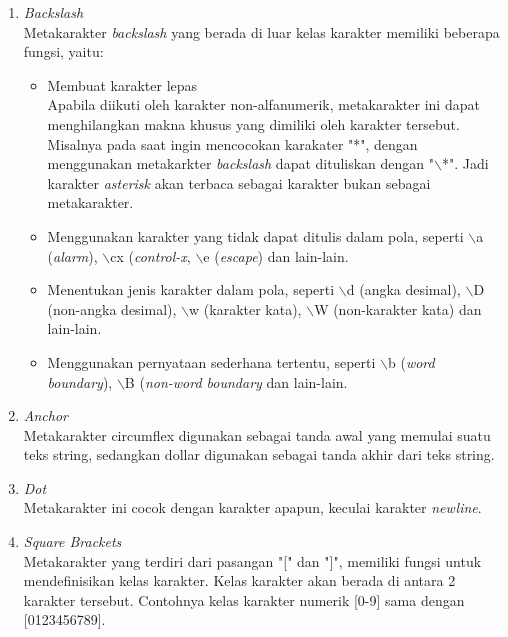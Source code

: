 \begin{enumerate}
	\item \textit{Backslash} \\
	Metakarakter \textit{backslash} yang berada di luar kelas karakter memiliki beberapa fungsi, yaitu:
	\begin{itemize}
		\item Membuat karakter lepas\\
		Apabila diikuti oleh karakter non-alfanumerik, metakarakter ini dapat menghilangkan makna khusus yang dimiliki oleh karakter tersebut. Misalnya pada saat ingin mencocokan karakater "*", dengan menggunakan metakarkter \textit{backslash} dapat dituliskan dengan "$\backslash$*". Jadi karakter \textit{asterisk} akan terbaca sebagai karakter bukan sebagai metakarakter.
				
		\item Menggunakan karakter yang tidak dapat ditulis dalam pola, seperti $\backslash$a (\textit{alarm}), $\backslash$cx (\textit{control-x}, $\backslash$e (\textit{escape}) dan lain-lain.
		
		\item Menentukan jenis karakter dalam pola, seperti $\backslash$d (angka desimal), $\backslash$D (non-angka desimal), $\backslash$w (karakter kata), $\backslash$W (non-karakter kata) dan lain-lain.
		
		\item Menggunakan pernyataan sederhana tertentu, seperti $\backslash$b (\textit{word boundary}), $\backslash$B (\textit{non-word boundary} dan lain-lain.
		
	\end{itemize}
	
	\item \textit{Anchor}\\
	Metakarakter circumflex digunakan sebagai tanda awal yang memulai suatu teks string, sedangkan dollar digunakan sebagai tanda akhir dari teks string.	
	
	\item \textit{Dot} \\
	Metakarakter ini cocok dengan karakter apapun, keculai karakter \textit{newline}.
	
	\item \textit{Square Brackets} \\
	Metakarakter yang terdiri dari pasangan "[" dan "]", memiliki fungsi untuk mendefinisikan kelas karakter. Kelas karakter akan berada di antara 2 karakter tersebut.	Contohnya kelas karakter numerik [0-9] sama dengan [0123456789].
	

\end{enumerate}

